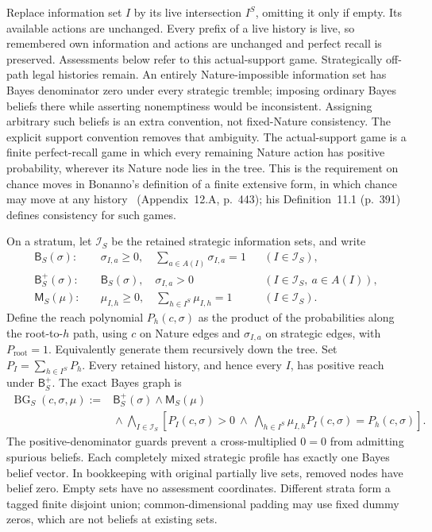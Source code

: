 \documentclass[11pt,a4paper]{article}
\numberwithin{equation}{section}
\theoremstyle{definition}
\DeclareMathOperator{\BG}{BG}
\begin{document}
Replace information set \(I\) by its live intersection \(I^S\), omitting
it only if empty. Its available actions are unchanged.
Every prefix of a live history is live, so remembered own information
and actions are unchanged and perfect recall is preserved.
Assessments below refer to this actual-support game.
Strategically off-path legal histories remain.
An entirely Nature-impossible information set has Bayes denominator
zero under every strategic tremble; imposing ordinary Bayes beliefs
there while asserting nonemptiness would be inconsistent.
Assigning arbitrary such beliefs is an extra convention, not fixed-Nature
consistency. The explicit support convention removes that ambiguity.
The actual-support game is a finite perfect-recall game in which every
remaining Nature action has positive probability, wherever its Nature
node lies in the tree. This is the requirement on chance moves in
Bonanno's definition of a finite extensive form, in which chance may
move at any history~\cite{Bonanno2015} (Appendix~12.A, p.~443); his
Definition~11.1 (p.~391) defines consistency for such games.

On a stratum, let \(\mathcal I_S\) be the retained strategic information
sets, and write
\begin{align*}
 \mathsf B_S(\sigma):\quad&
   \sigma_{I,a}\ge0,\quad\sum_{a\in A(I)}\sigma_{I,a}=1
                    &&(I\in\mathcal I_S),\\
 \mathsf B_S^+(\sigma):\quad&
   \mathsf B_S(\sigma),\quad \sigma_{I,a}>0
                    &&(I\in\mathcal I_S,\ a\in A(I)),\\
 \mathsf M_S(\mu):\quad&
   \mu_{I,h}\ge0,\quad\sum_{h\in I^S}\mu_{I,h}=1
                    &&(I\in\mathcal I_S).
\end{align*}
Define the reach polynomial \(P_h(c,\sigma)\) as the product of
the probabilities along the root-to-\(h\) path, using \(c\) on Nature
edges and \(\sigma_{I,a}\) on strategic edges, with \(P_{\mathrm{root}}=1\).
Equivalently generate them recursively down the tree.
Set \(P_I=\sum_{h\in I^S}P_h\).
Every retained history, and hence every \(I\), has positive reach under
\(\mathsf B_S^+\). The exact Bayes graph is
\begin{equation}\label{eq:Bayes}
 \begin{split}
 \BG_S(c,\sigma,\mu):={}&
 \mathsf B_S^+(\sigma)\wedge\mathsf M_S(\mu)\\
 &{}\wedge\bigwedge_{I\in\mathcal I_S}
   \left[P_I(c,\sigma)>0\ \wedge\
    \bigwedge_{h\in I^S}\mu_{I,h}P_I(c,\sigma)=P_h(c,\sigma)\right].
 \end{split}
\end{equation}
The positive-denominator guards prevent a cross-multiplied \(0=0\)
from admitting spurious beliefs.
Each completely mixed strategic profile has exactly one Bayes belief
vector. In bookkeeping with original partially live sets, removed
nodes have belief zero. Empty sets have no assessment coordinates.
Different strata form a tagged finite disjoint union; common-dimensional
padding may use fixed dummy zeros, which are not beliefs at existing sets.
\end{document}
